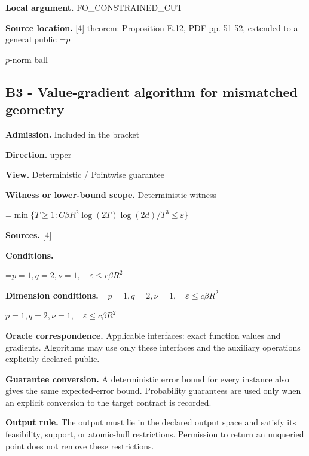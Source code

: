 \documentclass[10pt,a4paper]{article}
\newcommand{\AtlasMath}[1]{\par\begingroup\centering\setbox0=\hbox{$\displaystyle #1$}\ifdim\wd0>1.4\linewidth\typeout{ATLAS WIDE FORMULA: \the\wd0}\fi\ifdim\wd0>\linewidth\resizebox{\linewidth}{!}{\box0}\else\box0\fi\par\endgroup}
\newcommand{\AtlasInlineMath}[1]{\begingroup\setbox0=\hbox{$#1$}\ifdim\wd0>.4\linewidth\endgroup\AtlasMath{#1}\else\endgroup$#1$\fi}
\begin{document}
\textbf{Local argument.} FO\_CONSTRAINED\_CUT



\textbf{Source location.} \href{https://arxiv.org/pdf/2609.32910}{[4]} theorem: Proposition E.12, PDF pp. 51-52, extended to a general public \AtlasInlineMath{p}-norm ball



\subsection{B3 - Value-gradient algorithm for mismatched geometry}


\textbf{Admission.} Included in the bracket



\textbf{Direction.} upper



\textbf{View.} Deterministic / Pointwise guarantee



\textbf{Witness or lower-bound scope.} Deterministic witness



\AtlasMath{\min\{T\ge1:C\beta R^2\log(2T)\log(2d)/T^3\le\varepsilon\}}


\textbf{Sources.} \href{https://arxiv.org/pdf/2609.32910}{[4]}



\textbf{Conditions.}
\AtlasMath{p=1,q=2,\nu=1,\quad\varepsilon\le c\beta R^2}




\textbf{Dimension conditions.} \AtlasInlineMath{p=1,q=2,\nu=1,\quad\varepsilon\le c\beta R^2}



\textbf{Oracle correspondence.} Applicable interfaces: exact function values and gradients. Algorithms may use only these interfaces and the auxiliary operations explicitly declared public.



\textbf{Guarantee conversion.} A deterministic error bound for every instance also gives the same expected-error bound. Probability guarantees are used only when an explicit conversion to the target contract is recorded.



\textbf{Output rule.} The output must lie in the declared output space and satisfy its feasibility, support, or atomic-hull restrictions. Permission to return an unqueried point does not remove these restrictions.
\end{document}
